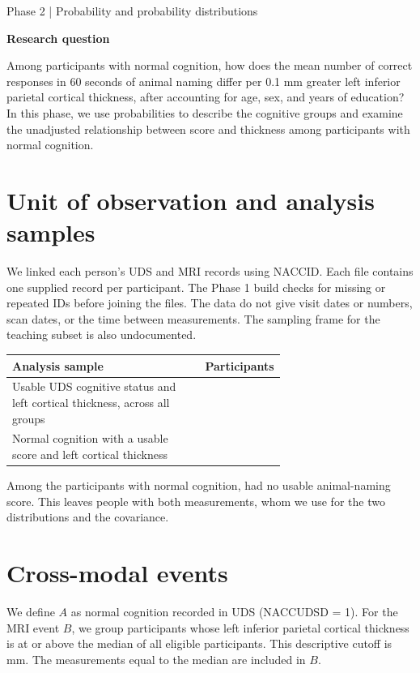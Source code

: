 \documentclass[11pt]{article}
\begin{document}
\vspace{7mm}

\vspace{3mm}
{\Large Phase 2 | Probability and probability distributions\par}
\vspace{5mm}

{\large\bfseries Research question}\par
Among participants with normal cognition, how does the mean number of
correct responses in 60 seconds of animal naming differ per 0.1 mm greater
left inferior parietal cortical thickness, after accounting for age, sex,
and years of education? In this phase, we use probabilities to describe
the cognitive groups and examine the unadjusted relationship between
score and thickness among participants with normal cognition.

\section{Unit of observation and analysis samples}
We linked each person's UDS and MRI records using NACCID. Each file
contains one supplied record per participant. The Phase 1 build checks
for missing or repeated IDs before joining the files. The data do not
give visit dates or numbers, scan dates, or the time between measurements.
The sampling frame for the teaching subset is also undocumented.

\begin{center}\small
\begin{tabular}{@{}p{0.67\linewidth}r@{}}
\toprule
Analysis sample & Participants \\
\midrule
Usable UDS cognitive status and left cortical thickness, across all groups & \EventN{} \\
Normal cognition with a usable score and left cortical thickness & \PairedN{} \\
\bottomrule
\end{tabular}
\end{center}

Among the \NormalN{} participants with normal cognition, \MissingScoreN{}
had no usable animal-naming score. This leaves \PairedN{} people with
both measurements, whom we use for the two distributions and the covariance.

\section{Cross-modal events}
We define $A$ as normal cognition recorded in UDS (NACCUDSD = 1).
For the MRI event $B$, we group participants whose left inferior parietal
cortical thickness is at or above the median of all \EventN{} eligible
participants. This descriptive cutoff is \ThicknessCut{} mm. The
\TiedN{} measurements equal to the median are included in $B$.
\end{document}
